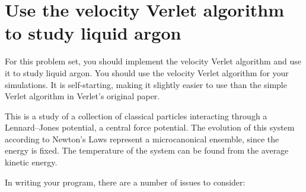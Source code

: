 \section{Use the velocity Verlet algorithm to study liquid argon}

For this problem set, you should implement the velocity Verlet algorithm and use
it to study liquid argon. You should use the
velocity Verlet algorithm for your simulations. It is self-starting, making it slightly
easier to use than the simple Verlet algorithm in Verlet's original paper.

This is a study of a collection of classical particles interacting through a Lennard--Jones
potential, a central force potential. The evolution of this system according to Newton's
Laws represent a microcanonical ensemble, since the energy is fixed. The temperature of the
system can be found from the average kinetic energy.

In writing your program, there are a number of issues to consider:

